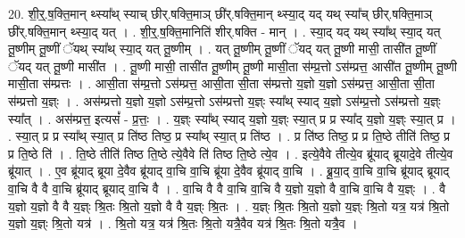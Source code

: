 \documentclass[17pt]{extarticle}
\begin{document}
20. शी॒र्॒.ष॒क्ति॒मान् थ्स्या᳚थ् स्याच् छीर्.षक्ति॒माञ् छी॑र्.षक्ति॒मान् थ्स्या॒द् यद् यथ् स्या᳚च् छीर्.षक्ति॒माञ् छी॑र्.षक्ति॒मान् थ्स्या॒द् यत् । . शी॒र्॒.ष॒क्ति॒मानिति॑ शीर्.षक्ति - मान् । . स्या॒द् यद् यथ् स्या᳚थ् स्या॒द् यत् तू॒ष्णीम् तू॒ष्णीं ॅयथ् स्या᳚थ् स्या॒द् यत् तू॒ष्णीम् । . यत् तू॒ष्णीम् तू॒ष्णीं ॅयद् यत् तू॒ष्णी मासी॒ तासी॑त तू॒ष्णीं ॅयद् यत् तू॒ष्णी मासी॑त । . तू॒ष्णी मासी॒ तासी॑त तू॒ष्णीम् तू॒ष्णी मासी॒ता स॑म्प्र॒त्तो ऽस॑म्प्रत्त॒ आसी॑त तू॒ष्णीम् तू॒ष्णी मासी॒ता स॑म्प्रत्तः । . आसी॒ता स॑म्प्र॒त्तो ऽस॑म्प्रत्त॒ आसी॒ता सी॒ता स॑म्प्रत्तो य॒ज्ञो य॒ज्ञो ऽस॑म्प्रत्त॒ आसी॒ता सी॒ता स॑म्प्रत्तो य॒ज्ञ्ः । . अस॑म्प्रत्तो य॒ज्ञो य॒ज्ञो ऽस॑म्प्र॒त्तो ऽस॑म्प्रत्तो य॒ज्ञ्ः स्या᳚थ् स्याद् य॒ज्ञो ऽस॑म्प्र॒त्तो ऽस॑म्प्रत्तो य॒ज्ञ्ः स्या᳚त् । . अस॑म्प्रत्त॒ इत्यसं᳚ - प्र॒त्तः॒ । . य॒ज्ञ्ः स्या᳚थ् स्याद् य॒ज्ञो य॒ज्ञ्ः स्या॒त् प्र प्र स्या᳚द् य॒ज्ञो य॒ज्ञ्ः स्या॒त् प्र । . स्या॒त् प्र प्र स्या᳚थ् स्या॒त् प्र ति॑ष्ठ तिष्ठ॒ प्र स्या᳚थ् स्या॒त् प्र ति॑ष्ठ । . प्र ति॑ष्ठ तिष्ठ॒ प्र प्र ति॒ष्ठे तीति॑ तिष्ठ॒ प्र प्र ति॒ष्ठे ति॑ । . ति॒ष्ठे तीति॑ तिष्ठ ति॒ष्ठे त्ये॒वैवे ति॑ तिष्ठ ति॒ष्ठे त्ये॒व । . इत्ये॒वैवे तीत्ये॒व ब्रू॑याद् ब्रूयादे॒वे तीत्ये॒व ब्रू॑यात् । . ए॒व ब्रू॑याद् ब्रूया दे॒वैव ब्रू॑याद् वा॒चि वा॒चि ब्रू॑या दे॒वैव ब्रू॑याद् वा॒चि । . ब्रू॒या॒द् वा॒चि वा॒चि ब्रू॑याद् ब्रूयाद् वा॒चि वै वै वा॒चि ब्रू॑याद् ब्रूयाद् वा॒चि वै । . वा॒चि वै वै वा॒चि वा॒चि वै य॒ज्ञो य॒ज्ञो वै वा॒चि वा॒चि वै य॒ज्ञ्ः । . वै य॒ज्ञो य॒ज्ञो वै वै य॒ज्ञ्ः श्रि॒तः श्रि॒तो य॒ज्ञो वै वै य॒ज्ञ्ः श्रि॒तः । . य॒ज्ञ्ः श्रि॒तः श्रि॒तो य॒ज्ञो य॒ज्ञ्ः श्रि॒तो यत्र॒ यत्र॑ श्रि॒तो य॒ज्ञो य॒ज्ञ्ः श्रि॒तो यत्र॑ । . श्रि॒तो यत्र॒ यत्र॑ श्रि॒तः श्रि॒तो यत्रै॒वैव यत्र॑ श्रि॒तः श्रि॒तो यत्रै॒व । \newline
\end{document}

